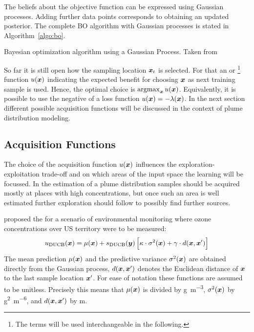 The beliefs about the objective function can be expressed using Gaussian 
processes. Adding further data points corresponds to obtaining an updated 
posterior. The complete BO algorithm with Gaussian processes is stated in 
Algorithm~\ref{algo:bo}.

\begin{algorithm}[t]
    \caption{Bayesian optimization algorithm using a Gaussian Process. Taken 
        from \textcite[6]{Brochu:2010um}}\label{algo:bo}
\end{algorithm}

So far it is still open how the sampling location $\bm{x}_t$ is selected. For 
that an  or \footnote{The terms will be 
    used interchangeable in the following.} function $u(\bm{x})$ indicating the 
expected benefit for choosing $\bm{x}$ as next training sample is used.  Hence, 
the optimal choice is $\operatorname*{argmax}_{\bm{x}} u(\bm{x})$.  Equivalently, it is possible 
to use the negative of a loss function $u(\bm{x}) = - \lambda(\bm{x})$. In the 
next section different possible acquisition functions will be discussed in the 
context of plume distribution modeling.

\subsection{Acquisition Functions}\label{sec:utility}
The choice of the acquisition function $u(\bm{x})$ influences the 
exploration-exploitation trade-off and on which areas of the input space the 
learning will be focussed.  In the estimation of a plume distribution samples 
should be acquired mostly at places with high concentrations, but once such an 
area is well estimated further exploration should follow to possibly find 
further sources.

\Textcite{Marchant:2012wb} proposed the  for a scenario of environmental monitoring where 
ozone concentrations over US territory were to be measured:
\begin{equation}
    u\ped{DUCB}(\vc x) = \mu(\vc x) + s\ped{DUCB}(\vc y) \sbr{\kappa \cdot 
        \sigma^2(\vc x) + \gamma \cdot d(\vc x, \vc x')}
\end{equation}
The mean prediction $\mu(\bm{x})$ and the predictive variance $\sigma^2(\bm{x})$ 
are obtained directly from the Gaussian process, $d(\bm{x}, \bm{x}')$ denotes the 
Euclidean distance of $\bm{x}$ to the last sample location $\bm{x}'$. For ease of 
notation these functions are assumed to be unitless. Precisely this means that 
$\mu(\bm{x})$ is divided by \si{\gram\per\meter\cubed}, $\sigma^2(\bm{x})$ by 
\si{{\gram\squared\per\meter\tothe{6}}}, and $d(\bm{x}, \bm{x}')$ by \si{\meter}.

